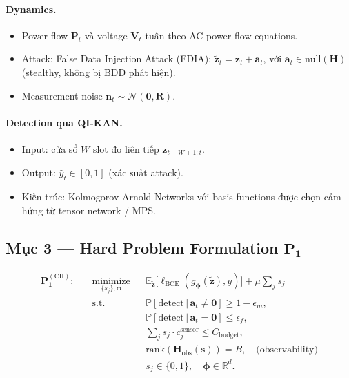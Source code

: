 \documentclass[11pt,a4paper]{article}
\begin{document}
\paragraph{Dynamics.}
\begin{itemize}
  \item Power flow $\mathbf{P}_t$ và voltage $\mathbf{V}_t$ tuân theo AC power-flow equations.
  \item Attack: False Data Injection Attack (FDIA): $\tilde{\mathbf{z}}_t = \mathbf{z}_t + \mathbf{a}_t$, với $\mathbf{a}_t \in \mathrm{null}(\mathbf{H})$ (stealthy, không bị BDD phát hiện).
  \item Measurement noise $\mathbf{n}_t \sim \mathcal{N}(\mathbf{0}, \mathbf{R})$.
\end{itemize}

\paragraph{Detection qua QI-KAN.}
\begin{itemize}
  \item Input: cửa sổ $W$ slot đo liên tiếp $\mathbf{z}_{t-W+1:t}$.
  \item Output: $\hat{y}_t \in [0,1]$ (xác suất attack).
  \item Kiến trúc: Kolmogorov-Arnold Networks với basis functions được chọn cảm hứng từ tensor network / MPS.
\end{itemize}

\subsection{Mục 3 --- Hard Problem Formulation $\mathbf{P_1}$}

$$
\begin{aligned}
\mathbf{P_1^{(\mathrm{CII})}}: \quad
& \underset{\{s_j\}, \boldsymbol{\phi}}{\text{minimize}}
  && \mathbb{E}_{\tilde{\mathbf{z}}}\big[ \ell_{\mathrm{BCE}}(g_{\boldsymbol{\phi}}(\tilde{\mathbf{z}}), y) \big]
     + \mu \sum_{j} s_j \\
& \text{s.t.}
  && \mathbb{P}[\mathrm{detect}\,|\,\mathbf{a}_t \ne \mathbf{0}] \geq 1 - \epsilon_m, \\
&  && \mathbb{P}[\mathrm{detect}\,|\,\mathbf{a}_t = \mathbf{0}] \leq \epsilon_f, \\
&  && \sum_{j} s_j \cdot c_j^{\mathrm{sensor}} \leq C_{\mathrm{budget}}, \\
&  && \mathrm{rank}(\mathbf{H}_{\mathrm{obs}}(\mathbf{s})) = B, \quad \text{(observability)} \\
&  && s_j \in \{0,1\}, \quad \boldsymbol{\phi} \in \mathbb{R}^d.
\end{aligned}
$$
\end{document}
